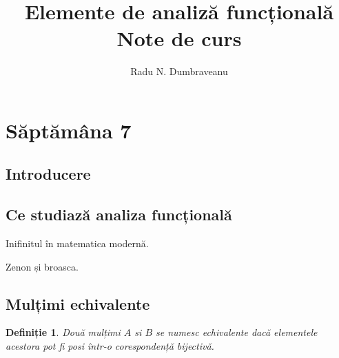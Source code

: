 \documentclass[a4paper,12pt]{article}
\title{Elemente de analiză funcțională\\Note de curs}
\author{Radu N. Dumbraveanu}
\theoremstyle{change}
\newtheorem{definition}[theorem]{Definiție}
\begin{document}
\maketitle

\tableofcontents

\section{Săptămâna 7}

\subsection{Introducere}

\subsection{Ce studiază analiza funcțională}


Inifinitul în matematica modernă.

Zenon și broasca.



\subsection{Mulțimi echivalente}

\begin{definition}
Două mulțimi $A$ si $B$ se numesc \emph{echivalente} dacă elementele acestora pot 
fi posi într-o corespondență bijectivă.
\end{definition}
\end{document}
